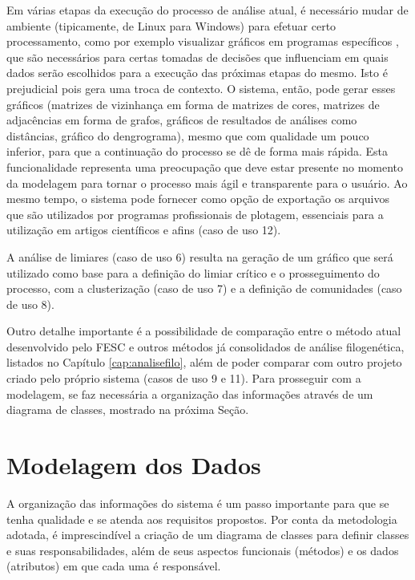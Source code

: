 Em várias etapas da execução do processo de análise atual, é necessário mudar de ambiente (tipicamente, de Linux para Windows) para efetuar certo processamento,
como por exemplo visualizar
gráficos em
programas específicos \cite{origin},
que são necessários para certas tomadas de decisões que influenciam em quais dados serão escolhidos para a execução das próximas etapas do mesmo. Isto é
prejudicial pois gera uma troca de contexto. O sistema, então, pode gerar esses gráficos (matrizes de vizinhança em forma de matrizes de cores, matrizes de
adjacências em forma de grafos, gráficos de resultados de análises como distâncias, gráfico do dengrograma), mesmo que com qualidade um pouco inferior,
para que a continuação do processo se dê de forma mais rápida. Esta funcionalidade representa
uma preocupação que deve estar presente no momento da modelagem para
tornar o processo mais ágil e transparente para o usuário. Ao mesmo tempo, o sistema pode fornecer como opção de exportação os arquivos que são utilizados por
programas profissionais de plotagem, essenciais para a utilização em artigos científicos e afins (caso de uso 12).

A análise de limiares (caso de uso 6) resulta na geração de um gráfico que será utilizado como base para a definição do limiar crítico e o prosseguimento
do processo, com a clusterização (caso de uso 7) e a definição de comunidades (caso de uso 8).

Outro detalhe importante é a possibilidade de comparação entre o método atual desenvolvido pelo FESC
e outros métodos já consolidados de análise filogenética, listados no Capítulo \ref{cap:analisefilo},
além de poder comparar com outro projeto criado pelo próprio sistema (casos de uso 9 e 11).
Para prosseguir com a modelagem, se faz necessária a organização das informações através
de um diagrama de classes, mostrado na próxima Seção.

\section{Modelagem dos Dados} \label{sec:organizacao}

A organização das informações do sistema é um passo importante para que se tenha qualidade e se atenda aos requisitos propostos. Por conta da metodologia
adotada, é imprescindível a criação de um diagrama de classes para definir classes e suas responsabilidades, além de seus aspectos funcionais (métodos)
e os dados
(atributos) em que cada uma é responsável.

